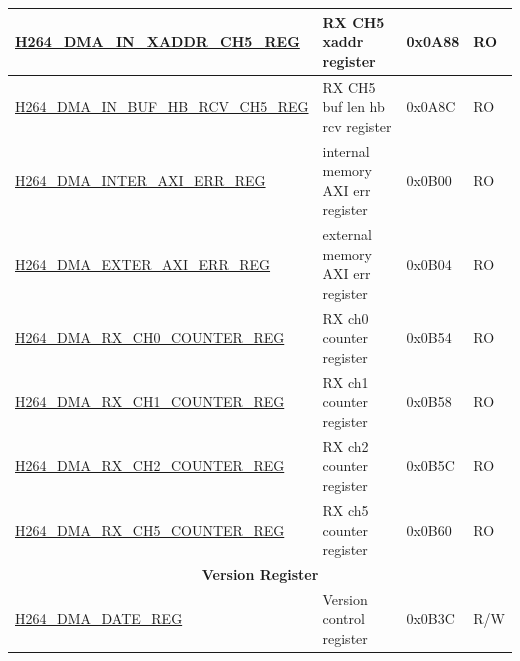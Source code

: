 \begin{longtable}{ | p{7.5cm} | p{5.7cm} | p{1.2cm} | p{1cm} | }
    \hyperref[regdesc:H264DMAINXADDRCH5REG]{H264\_DMA\_IN\_XADDR\_CH5\_REG} & RX CH5 xaddr register & 0x0A88 & RO \\ \hline
    \hyperref[regdesc:H264DMAINBUFHBRCVCH5REG]{H264\_DMA\_IN\_BUF\_HB\_RCV\_CH5\_REG} & RX CH5 buf len hb rcv register & 0x0A8C & RO \\ \hline
    \hyperref[regdesc:H264DMAINTERAXIERRREG]{H264\_DMA\_INTER\_AXI\_ERR\_REG} & internal memory AXI err register & 0x0B00 & RO \\ \hline
    \hyperref[regdesc:H264DMAEXTERAXIERRREG]{H264\_DMA\_EXTER\_AXI\_ERR\_REG} & external memory AXI err register & 0x0B04 & RO \\ \hline
    \hyperref[regdesc:H264DMARXCH0COUNTERREG]{H264\_DMA\_RX\_CH0\_COUNTER\_REG} & RX ch0 counter register & 0x0B54 & RO \\ \hline
    \hyperref[regdesc:H264DMARXCH1COUNTERREG]{H264\_DMA\_RX\_CH1\_COUNTER\_REG} & RX ch1 counter register & 0x0B58 & RO \\ \hline
    \hyperref[regdesc:H264DMARXCH2COUNTERREG]{H264\_DMA\_RX\_CH2\_COUNTER\_REG} & RX ch2 counter register & 0x0B5C & RO \\ \hline
    \hyperref[regdesc:H264DMARXCH5COUNTERREG]{H264\_DMA\_RX\_CH5\_COUNTER\_REG} & RX ch5 counter register & 0x0B60 & RO \\ \hline
    
    \multicolumn{4}{|c|}{\cellcolor{gray!15}\textbf{Version Register}} \\ \hline
    \hyperref[regdesc:H264DMADATEREG]{H264\_DMA\_DATE\_REG} & Version control register & 0x0B3C & R/W \\ \hline
    \end{longtable}
